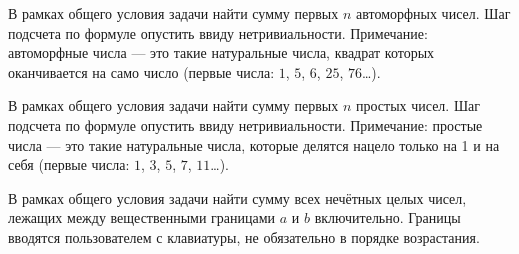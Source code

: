 
\begin{zztask}
В рамках общего условия задачи найти сумму первых $n$ автоморфных чисел.
Шаг подсчета по формуле опустить ввиду нетривиальности. Примечание:
автоморфные числа --- это такие натуральные числа, квадрат которых
оканчивается на само число (первые числа: $1$, $5$, $6$, $25$, $76$\dots).
\end{zztask}


\begin{zztask}
В рамках общего условия задачи найти сумму первых $n$ простых чисел. Шаг
подсчета по формуле опустить ввиду нетривиальности. Примечание: простые
числа --- это такие натуральные числа, которые делятся нацело только на 1 и
на себя (первые числа: $1$, $3$, $5$, $7$, $11$\dots).
\end{zztask}


\begin{zztask}
В рамках общего условия задачи найти сумму всех нечётных целых чисел,
лежащих между вещественными границами $a$ и $b$ включительно. Границы вводятся
пользователем с клавиатуры, не обязательно в порядке возрастания.
\end{zztask}


